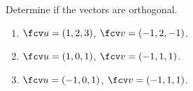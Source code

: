 Determine if the vectors are orthogonal.

\begin{enumerate}
\item $\fcv u=(1, 2, 3 )$, $\fcv v=(-1,2,-1)$.
\item $\fcv u=( 1, 0, 1 )$, $\fcv v=(-1,1,1)$.
\item $\fcv u=( -1, 0, 1 )$, $\fcv v=(-1,1,1)$.
\end{enumerate}
